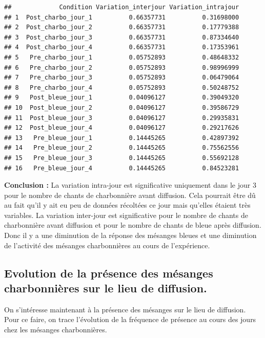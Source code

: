 \documentclass[
  french,
]{article}
\begin{document}
\begin{verbatim}
##             Condition Variation_interjour Variation_intrajour
## 1  Post_charbo_jour_1          0.66357731          0.31698000
## 2  Post_charbo_jour_2          0.66357731          0.17779388
## 3  Post_charbo_jour_3          0.66357731          0.87334640
## 4  Post_charbo_jour_4          0.66357731          0.17353961
## 5   Pre_charbo_jour_1          0.05752893          0.48648332
## 6   Pre_charbo_jour_2          0.05752893          0.98996999
## 7   Pre_charbo_jour_3          0.05752893          0.06479064
## 8   Pre_charbo_jour_4          0.05752893          0.50248752
## 9   Post_bleue_jour_1          0.04096127          0.39049320
## 10  Post_bleue_jour_2          0.04096127          0.39586729
## 11  Post_bleue_jour_3          0.04096127          0.29935831
## 12  Post_bleue_jour_4          0.04096127          0.29217626
## 13   Pre_bleue_jour_1          0.14445265          0.42897392
## 14   Pre_bleue_jour_2          0.14445265          0.75562556
## 15   Pre_bleue_jour_3          0.14445265          0.55692128
## 16   Pre_bleue_jour_4          0.14445265          0.84523281
\end{verbatim}

\textbf{Conclusion : } La variation intra-jour est significative
uniquement dans le jour 3 pour le nombre de chants de charbonnière avant
diffusion. Cela pourrait être dû au fait qu'il y ait eu peu de données
récoltées ce jour mais qu'elles étaient très variables. La variation
inter-jour est significative pour le nombre de chants de charbonnière
avant diffusion et pour le nombre de chants de bleue après diffusion.
Donc il y a une diminution de la réponse des mésanges bleues et une
diminution de l'activité des mésanges charbonnières au cours de
l'expérience.

\subsection{Evolution de la présence des mésanges charbonnières sur le
lieu de
diffusion.}\label{evolution-de-la-pruxe9sence-des-muxe9sanges-charbonniuxe8res-sur-le-lieu-de-diffusion.}

On s'intéresse maintenant à la présence des mésanges sur le lieu de
diffusion. Pour ce faire, on trace l'évolution de la fréquence de
présence au cours des jours chez les mésanges charbonnières.
\end{document}
